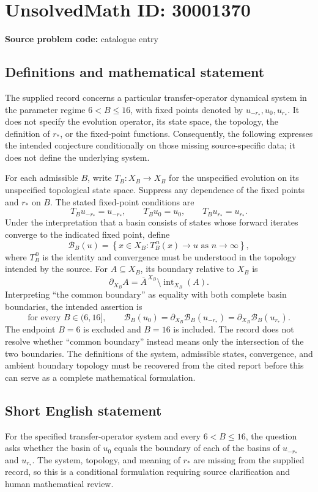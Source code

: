 \documentclass[11pt]{article}
\begin{document}
\section*{UnsolvedMath ID: 30001370}
\textbf{Source problem code:} catalogue entry
\subsection{Definitions and mathematical statement}
The supplied record concerns a particular transfer-operator dynamical system in the parameter regime \(6<B\leq16\), with fixed points denoted by \(u_{-r_*},u_0,u_{r_*}\). It does not specify the evolution operator, its state space, the topology, the definition of \(r_*\), or the fixed-point functions. Consequently, the following expresses the intended conjecture conditionally on those missing source-specific data; it does not define the underlying system.

For each admissible \(B\), write \(T_B:X_B\to X_B\) for the unspecified evolution on its unspecified topological state space. Suppress any dependence of the fixed points and \(r_*\) on \(B\). The stated fixed-point conditions are
\[
T_Bu_{-r_*}=u_{-r_*},\qquad T_Bu_0=u_0,\qquad T_Bu_{r_*}=u_{r_*}.
\]
Under the interpretation that a basin consists of states whose forward iterates converge to the indicated fixed point, define
\[
\mathcal B_B(u)=\left\{x\in X_B:T_B^{\,n}(x)\longrightarrow u\text{ as }n\to\infty\right\},
\]
where \(T_B^{\,0}\) is the identity and convergence must be understood in the topology intended by the source. For \(A\subseteq X_B\), its boundary relative to \(X_B\) is
\[
\partial_{X_B}A=\overline{A}^{\,X_B}\setminus\operatorname{int}_{X_B}(A).
\]
Interpreting ``the common boundary'' as equality with both complete basin boundaries, the intended assertion is
\[
\text{for every }B\in(6,16],\qquad
\mathcal B_B(u_0)
=\partial_{X_B}\mathcal B_B(u_{-r_*})
=\partial_{X_B}\mathcal B_B(u_{r_*}).
\]
The endpoint \(B=6\) is excluded and \(B=16\) is included. The record does not resolve whether ``common boundary'' instead means only the intersection of the two boundaries. The definitions of the system, admissible states, convergence, and ambient boundary topology must be recovered from the cited report before this can serve as a complete mathematical formulation.
\subsection{Short English statement}
For the specified transfer-operator system and every \(6<B\leq16\), the question asks whether the basin of \(u_0\) equals the boundary of each of the basins of \(u_{-r_*}\) and \(u_{r_*}\). The system, topology, and meaning of \(r_*\) are missing from the supplied record, so this is a conditional formulation requiring source clarification and human mathematical review.
\end{document}
